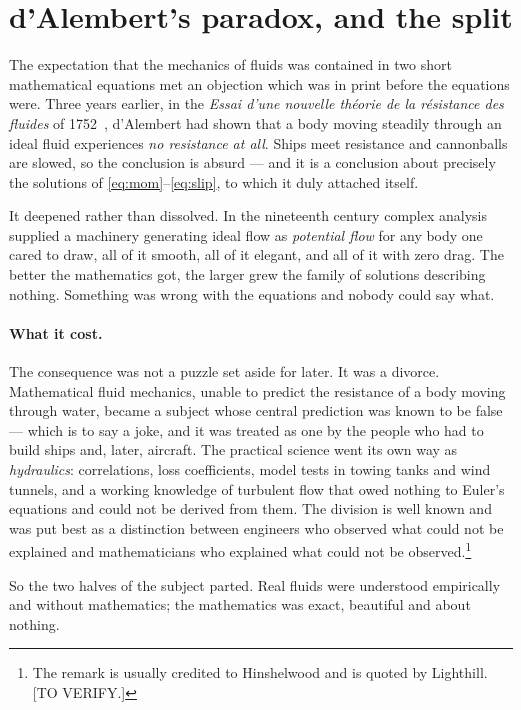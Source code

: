 \documentclass[11pt]{article}
\begin{document}
\section{d'Alembert's paradox, and the split}\label{sec:dalembert}

The expectation that the mechanics of fluids was contained in two short mathematical equations met an
objection which was in print before the equations were. Three years earlier, in the \emph{Essai d'une
nouvelle th\'eorie de la r\'esistance des fluides} of 1752~\cite{dalembert1752}, d'Alembert had shown
that a body moving steadily through an ideal fluid experiences \emph{no resistance at all}. Ships
meet resistance and cannonballs are slowed, so the conclusion is absurd --- and it is a conclusion
about precisely the solutions of \eqref{eq:mom}--\eqref{eq:slip}, to which it duly attached itself.

It deepened rather than dissolved. In the nineteenth century complex analysis supplied a machinery
generating ideal flow as \emph{potential flow} for any body one cared to draw, all of it smooth, all
of it elegant, and all of it with zero drag. The better the mathematics got, the larger grew the
family of solutions describing nothing. Something was wrong with the equations and nobody could say
what.

\paragraph{What it cost.} The consequence was not a puzzle set aside for later. It was a divorce.
Mathematical fluid mechanics, unable to predict the resistance of a body moving through water, became
a subject whose central prediction was known to be false --- which is to say a joke, and it was
treated as one by the people who had to build ships and, later, aircraft. The practical science went
its own way as \emph{hydraulics}: correlations, loss coefficients, model tests in towing tanks and
wind tunnels, and a working knowledge of turbulent flow that owed nothing to Euler's equations and
could not be derived from them. The division is well known and was put best as a distinction between
engineers who observed what could not be explained and mathematicians who explained what could not be
observed.\footnote{The remark is usually credited to Hinshelwood and is quoted by Lighthill.
[TO VERIFY.]}

So the two halves of the subject parted. Real fluids were understood empirically and without
mathematics; the mathematics was exact, beautiful and about nothing.
\end{document}
